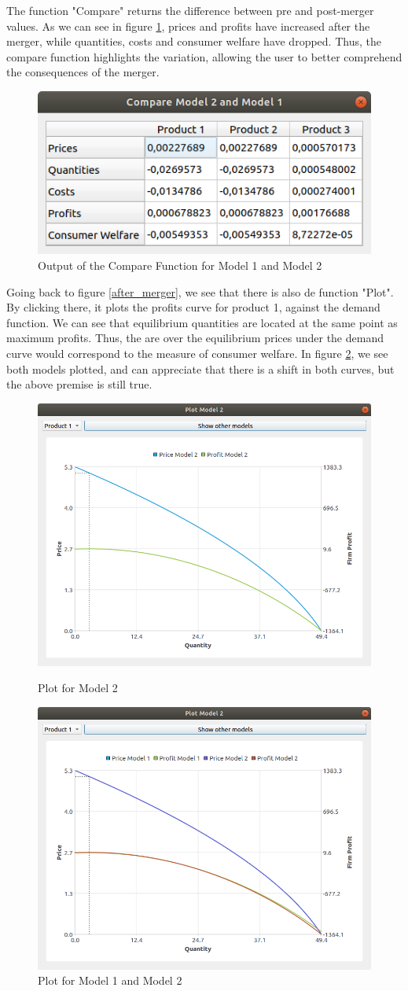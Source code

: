 \documentclass[12pt]{article}
\begin{document}
The function "Compare" returns the difference between pre and post-merger values. As we can see in figure \ref{compare}, prices and profits have increased after the merger, while quantities, costs and consumer welfare have dropped. Thus, the compare function highlights the variation, allowing the user to better comprehend the consequences of the merger. 
\begin{figure}[H]
\begin{center}
  \includegraphics[width=10 cm]{compare}
\caption{\label{compare} Output of the Compare Function for Model 1 and Model 2}
\end{center}
\end{figure}

Going back to figure \ref{after_merger}, we see that there is also de function "Plot". By clicking there, it plots the profits curve for product 1, against the demand function. We can see that equilibrium quantities are located at the same point as maximum profits. Thus, the are over the equilibrium prices under the demand curve would correspond to the measure of consumer welfare. In figure \ref{plot_2}, we see both models plotted, and can appreciate that there is a shift in both curves, but the above premise is still true. 
\begin{figure}[H]
\begin{center}
\begin{minipage}{2.75in}
  \includegraphics[width=5 cm]{plot_1}
\caption{\label{plot_1} Plot for Model 2}
\end{minipage}
\begin{minipage}{2.75in}
 \includegraphics[width=5 cm]{plot_2}
\caption{\label{plot_2} Plot for Model 1 and Model 2}
\end{minipage}
\end{center}
\end{figure}
\end{document}
